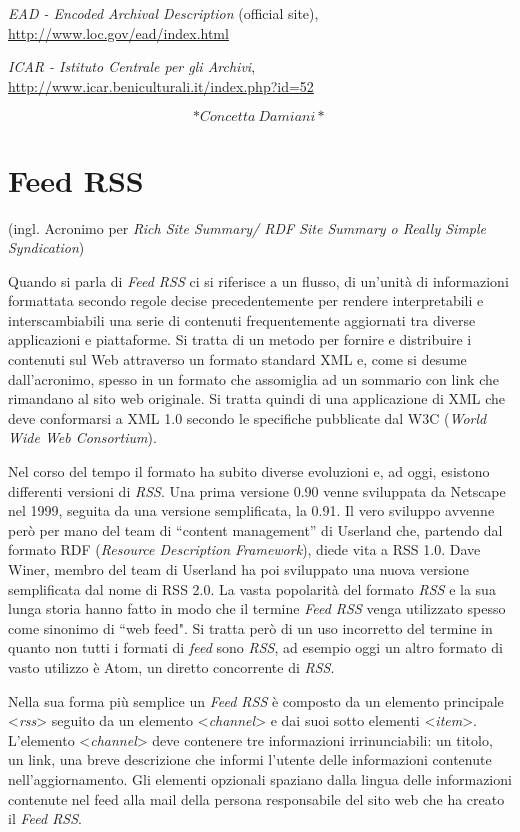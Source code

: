 \documentclass[
  b5paper,
  twoside,
  12pt,
  chapterprefix=false,
  bibliography=totocnumbered,
  parskip=false]{scrbook}
\begin{document}
\emph{EAD - Encoded Archival Description} (official site),
\url{http://www.loc.gov/ead/index.html}

\emph{ICAR - Istituto Centrale per gli Archivi},
\url{http://www.icar.beniculturali.it/index.php?id=52}

\[*Concetta~Damiani*\]

\hypertarget{feed-rss}{%
\chapter{Feed RSS}\label{feed-rss}}

(ingl. Acronimo per \emph{Rich Site Summary/ RDF Site Summary o Really Simple
Syndication})

Quando si parla di \emph{Feed RSS} ci si riferisce a un flusso, di un'unità
di informazioni formattata secondo regole decise precedentemente per
rendere interpretabili e interscambiabili una serie di contenuti
frequentemente aggiornati tra diverse applicazioni e piattaforme. Si
tratta di un metodo per fornire e distribuire i contenuti sul Web
attraverso un formato standard XML e, come si desume dall'acronimo,
spesso in un formato che assomiglia ad un sommario con link che
rimandano al sito web originale. Si tratta quindi di una applicazione di
XML che deve conformarsi a XML 1.0 secondo le specifiche pubblicate dal
W3C (\emph{World Wide Web Consortium}).

Nel corso del tempo il formato ha subito diverse evoluzioni e, ad oggi,
esistono differenti versioni di \emph{RSS}. Una prima versione 0.90 venne
sviluppata da Netscape nel 1999, seguita da una versione semplificata,
la 0.91. Il vero sviluppo avvenne però per mano del team di \enquote{content
management} di Userland che, partendo dal formato RDF (\emph{Resource
Description Framework}), diede vita a RSS 1.0. Dave Winer, membro del
team di Userland ha poi sviluppato una nuova versione semplificata dal
nome di RSS 2.0. La vasta popolarità del formato \emph{RSS} e la sua lunga
storia hanno fatto in modo che il termine \emph{Feed RSS} venga utilizzato
spesso come sinonimo di ``web feed". Si tratta però di un uso incorretto
del termine in quanto non tutti i formati di \emph{feed} sono \emph{RSS}, ad
esempio oggi un altro formato di vasto utilizzo è Atom, un diretto
concorrente di \emph{RSS}.

Nella sua forma più semplice un \emph{Feed RSS} è composto da un elemento
principale \textless{}\emph{rss}\textgreater{} seguito da un elemento \textless{}\emph{channel}\textgreater{} e dai suoi
sotto elementi \textless{}\emph{item}\textgreater. L'elemento \textless{}\emph{channel}\textgreater{} deve contenere tre
informazioni irrinunciabili: un titolo, un link, una breve descrizione
che informi l'utente delle informazioni contenute nell'aggiornamento.
Gli elementi opzionali spaziano dalla lingua delle informazioni
contenute nel feed alla mail della persona responsabile del sito web che
ha creato il \emph{Feed RSS}.
\end{document}
